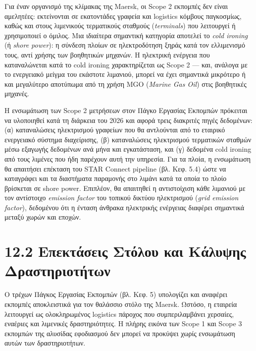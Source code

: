 Για έναν οργανισμό της κλίμακας της Maersk, οι Scope 2 εκπομπές δεν
είναι αμελητέες: εκτείνονται σε εκατοντάδες γραφεία και logistics
κόμβους παγκοσμίως, καθώς και στους λιμενικούς τερματικούς σταθμούς
(\emph{terminals}) που λειτουργεί ή χρησιμοποιεί ο όμιλος. Μια ιδιαίτερα
σημαντική κατηγορία αποτελεί το \emph{cold ironing} (ή \emph{shore
power}): η σύνδεση πλοίων σε ηλεκτροδότηση ξηράς κατά τον ελλιμενισμό
τους, αντί χρήσης των βοηθητικών μηχανών. Η ηλεκτρική ενέργεια που
καταναλώνεται κατά το cold ironing χαρακτηρίζεται ως Scope 2 --- και,
ανάλογα με το ενεργειακό μείγμα του εκάστοτε λιμανιού, μπορεί να έχει
σημαντικά μικρότερο ή και μεγαλύτερο αποτύπωμα από τη χρήση MGO
(\emph{Marine Gas Oil}) στις βοηθητικές μηχανές.

Η ενσωμάτωση των Scope 2 μετρήσεων στον Πάγκο Εργασίας Εκπομπών
πρόκειται να υλοποιηθεί κατά τη διάρκεια του 2026 και αφορά τρεις
διακριτές πηγές δεδομένων: (α) καταναλώσεις ηλεκτρισμού γραφείων που θα
αντλούνται από το εταιρικό ενεργειακό σύστημα διαχείρισης, (β)
καταναλώσεις ηλεκτρισμού τερματικών σταθμών μέσω εξαγωγής δεδομένων ανά
μήνα και εγκατάσταση, και (γ) δεδομένα cold ironing από τους λιμένες που
ήδη παρέχουν αυτή την υπηρεσία. Για τα πλοία, η ενσωμάτωση θα απαιτήσει
επέκταση του STAR Connect pipeline (βλ. Κεφ. 5.4) ώστε να καταγράφει και
τα διαστήματα παραμονής στο λιμάνι κατά τα οποία το πλοίο βρίσκεται σε
shore power. Επιπλέον, θα απαιτηθεί η αντιστοίχιση κάθε λιμανιού με τον
αντίστοιχο \emph{emission factor} του τοπικού δικτύου ηλεκτρισμού
(\emph{grid emission factor}), δεδομένου ότι η ένταση άνθρακα ηλεκτρικής
ενέργειας διαφέρει σημαντικά μεταξύ χωρών και εποχών.

\section{12.2 Επεκτάσεις Στόλου και Κάλυψης
Δραστηριοτήτων}\label{ux3b5ux3c0ux3b5ux3baux3c4ux3acux3c3ux3b5ux3b9ux3c2-ux3c3ux3c4ux3ccux3bbux3bfux3c5-ux3baux3b1ux3b9-ux3baux3acux3bbux3c5ux3c8ux3b7ux3c2-ux3b4ux3c1ux3b1ux3c3ux3c4ux3b7ux3c1ux3b9ux3bfux3c4ux3aeux3c4ux3c9ux3bd}

Ο τρέχων Πάγκος Εργασίας Εκπομπών (βλ. Κεφ. 5) υπολογίζει και αναφέρει
εκπομπές αποκλειστικά για τον θαλάσσιο στόλο της Maersk. Ωστόσο, η
εταιρεία λειτουργεί ως ολοκληρωμένος logistics πάροχος που
συμπεριλαμβάνει χερσαίες, εναέριες και λιμενικές δραστηριότητες. Η
πλήρης εικόνα των Scope 1 και Scope 3 εκπομπών της αλυσίδας εφοδιασμού
δεν μπορεί να προκύψει χωρίς ενσωμάτωση αυτών των δραστηριοτήτων.


